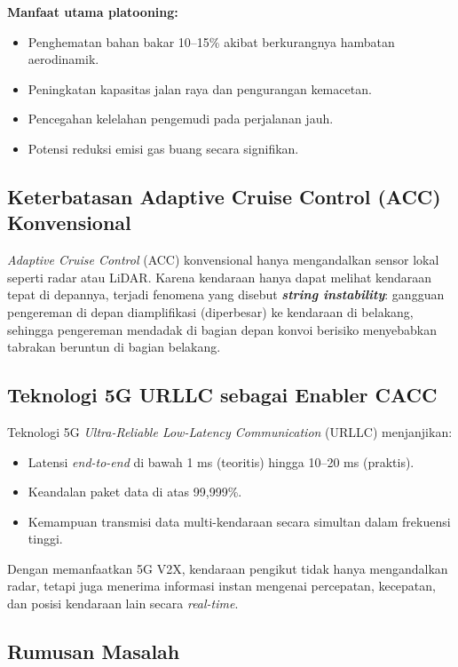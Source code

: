 \documentclass[12pt,a4paper]{article}
\begin{document}
\textbf{Manfaat utama platooning:}
\begin{itemize}[noitemsep]
  \item Penghematan bahan bakar 10--15\% akibat berkurangnya hambatan aerodinamik.
  \item Peningkatan kapasitas jalan raya dan pengurangan kemacetan.
  \item Pencegahan kelelahan pengemudi pada perjalanan jauh.
  \item Potensi reduksi emisi gas buang secara signifikan.
\end{itemize}

\subsection{Keterbatasan Adaptive Cruise Control (ACC) Konvensional}

\textit{Adaptive Cruise Control} (ACC) konvensional hanya mengandalkan sensor lokal seperti
radar atau LiDAR. Karena kendaraan hanya dapat melihat kendaraan tepat di depannya, terjadi
fenomena yang disebut \textbf{\textit{string instability}}: gangguan pengereman di depan
diamplifikasi (diperbesar) ke kendaraan di belakang, sehingga pengereman mendadak di bagian
depan konvoi berisiko menyebabkan tabrakan beruntun di bagian belakang.

\subsection{Teknologi 5G URLLC sebagai Enabler CACC}

Teknologi 5G \textit{Ultra-Reliable Low-Latency Communication} (URLLC) menjanjikan:
\begin{itemize}[noitemsep]
  \item Latensi \textit{end-to-end} di bawah 1 ms (teoritis) hingga 10--20 ms (praktis).
  \item Keandalan paket data di atas 99{,}999\%.
  \item Kemampuan transmisi data multi-kendaraan secara simultan dalam frekuensi tinggi.
\end{itemize}

Dengan memanfaatkan 5G V2X, kendaraan pengikut tidak hanya mengandalkan radar, tetapi
juga menerima informasi instan mengenai percepatan, kecepatan, dan posisi kendaraan lain
secara \textit{real-time}.

\subsection{Rumusan Masalah}
\end{document}

